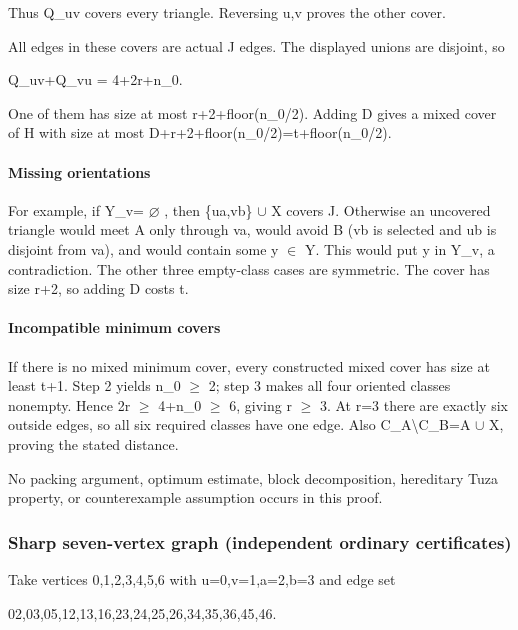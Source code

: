 \documentclass[11pt]{article}
\begin{document}
Thus Q\_uv covers every triangle. Reversing u,v proves the other cover.

All edges in these covers are actual J edges. The displayed unions are disjoint, so

\textbar Q\_uv\textbar+\textbar Q\_vu\textbar{} = 4+2r+n\_0.

One of them has size at most r+2+floor(n\_0/2). Adding D gives a mixed cover of H with size at most \textbar D\textbar+r+2+floor(n\_0/2)=t+floor(n\_0/2).

\paragraph{Missing orientations}\label{missing-orientations}

For example, if Y\_v= \(\varnothing\) , then \{ua,vb\} \(\cup\) X covers J. Otherwise an uncovered triangle would meet A only through va, would avoid B (vb is selected and ub is disjoint from va), and would contain some y \(\in\) Y. This would put y in Y\_v, a contradiction. The other three empty-class cases are symmetric. The cover has size r+2, so adding D costs t.

\paragraph{Incompatible minimum covers}\label{incompatible-minimum-covers}

If there is no mixed minimum cover, every constructed mixed cover has size at least t+1. Step 2 yields n\_0 \(\ge\) 2; step 3 makes all four oriented classes nonempty. Hence 2r \(\ge\) 4+n\_0 \(\ge\) 6, giving r \(\ge\) 3. At r=3 there are exactly six outside edges, so all six required classes have one edge. Also C\_A\textbackslash C\_B=A \(\cup\) X, proving the stated distance.

No packing argument, optimum estimate, block decomposition, hereditary Tuza property, or counterexample assumption occurs in this proof.

\subsubsection{Sharp seven-vertex graph (independent ordinary certificates)}\label{sharp-seven-vertex-graph-independent-ordinary-certificates}

Take vertices 0,1,2,3,4,5,6 with u=0,v=1,a=2,b=3 and edge set

02,03,05,12,13,16,23,24,25,26,34,35,36,45,46.
\end{document}
